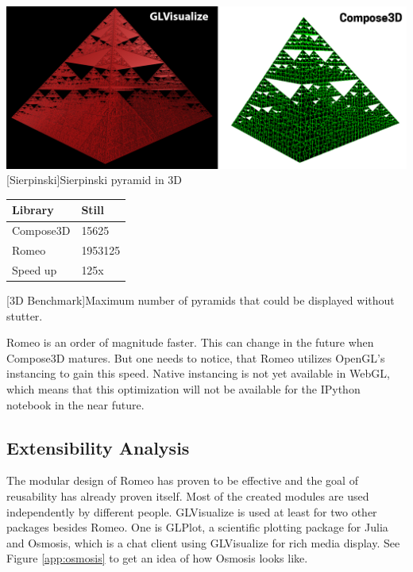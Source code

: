 \begin{minipage}{\linewidth}
    \centering
    \includegraphics[width=\linewidth]{graphics/sierpinsky.jpg}
    [Sierpinski]{Sierpinski pyramid in 3D}
    \label{fig:reactive1}
\end{minipage}
\begin{table}[htbp]
    \centering
    \begin{tabular}{l|l}
        \hline
        \textbf{Library} & \textbf{Still}\\ 
        \hline
        Compose3D        & 15625         \\
        Romeo            & 1953125       \\
        \hline
        \hline
        Speed up         & 125x          \\
    \end{tabular}
    [3D Benchmark]{Maximum number of pyramids that could be displayed without stutter.}
    \label{table:relativespeedoglw}
\end{table}

Romeo is an order of magnitude faster. This can change in the future when Compose3D matures.
But one needs to notice, that Romeo utilizes OpenGL's instancing to gain this speed. Native instancing is not yet available in WebGL, which means that this optimization will not be available for the IPython notebook in the near future.

\subsection{Extensibility Analysis}

The modular design of Romeo has proven to be effective and the goal of reusability has already proven itself.
Most of the created modules are used independently by different people.
GLVisualize is used at least for two other packages besides Romeo. 
One is GLPlot\cite{GLPlot}, a scientific plotting package for Julia and Osmosis\cite{Osmosis}, which is a chat client using GLVisualize for rich media display.
See Figure \ref{app:osmosis} to get an idea of how Osmosis looks like.

